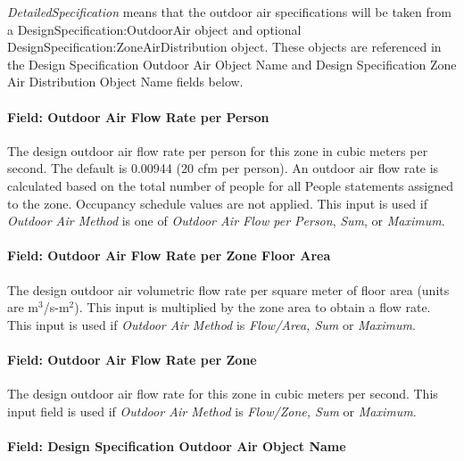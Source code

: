 \emph{DetailedSpecification} means that the outdoor air specifications will be taken from a DesignSpecification:OutdoorAir object and optional DesignSpecification:ZoneAirDistribution object. These objects are referenced in the Design Specification Outdoor Air Object Name and Design Specification Zone Air Distribution Object Name fields below.

\paragraph{Field: Outdoor Air Flow Rate per Person}\label{field-outdoor-air-flow-rate-per-person-6}

The design outdoor air flow rate per person for this zone in cubic meters per second. The default is 0.00944 (20 cfm per person). An outdoor air flow rate is calculated based on the total number of people for all People statements assigned to the zone. Occupancy schedule values are not applied. This input is used if \emph{Outdoor Air Method} is one of \emph{Outdoor Air Flow per Person}, \emph{Sum}, or \emph{Maximum}.

\paragraph{Field: Outdoor Air Flow Rate per Zone Floor Area}\label{field-outdoor-air-flow-rate-per-zone-floor-area-6}

The design outdoor air volumetric flow rate per square meter of floor area (units are m\(^{3}\)/s-m\(^{2}\)). This input is multiplied by the zone area to obtain a flow rate. This input is used if \emph{Outdoor Air Method} is \emph{Flow/Area, Sum} or \emph{Maximum}.

\paragraph{Field: Outdoor Air Flow Rate per Zone}\label{field-outdoor-air-flow-rate-per-zone-6}

The design outdoor air flow rate for this zone in cubic meters per second. This input field is used if \emph{Outdoor Air Method} is \emph{Flow/Zone, Sum} or \emph{Maximum}.

\paragraph{Field: Design Specification Outdoor Air Object Name}\label{field-design-specification-outdoor-air-object-name-6}

